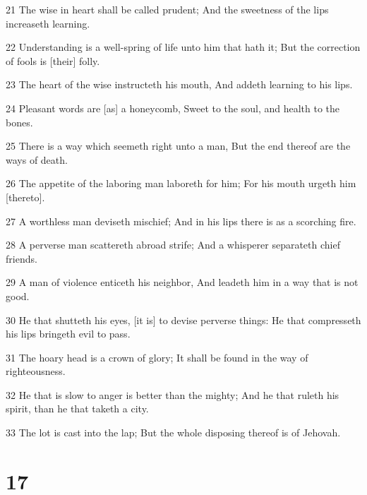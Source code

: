 \par 21 The wise in heart shall be called prudent; And the sweetness of the lips increaseth learning.
\par 22 Understanding is a well-spring of life unto him that hath it; But the correction of fools is [their] folly.
\par 23 The heart of the wise instructeth his mouth, And addeth learning to his lips.
\par 24 Pleasant words are [as] a honeycomb, Sweet to the soul, and health to the bones.
\par 25 There is a way which seemeth right unto a man, But the end thereof are the ways of death.
\par 26 The appetite of the laboring man laboreth for him; For his mouth urgeth him [thereto].
\par 27 A worthless man deviseth mischief; And in his lips there is as a scorching fire.
\par 28 A perverse man scattereth abroad strife; And a whisperer separateth chief friends.
\par 29 A man of violence enticeth his neighbor, And leadeth him in a way that is not good.
\par 30 He that shutteth his eyes, [it is] to devise perverse things: He that compresseth his lips bringeth evil to pass.
\par 31 The hoary head is a crown of glory; It shall be found in the way of righteousness.
\par 32 He that is slow to anger is better than the mighty; And he that ruleth his spirit, than he that taketh a city.
\par 33 The lot is cast into the lap; But the whole disposing thereof is of Jehovah.

\chapter{17}

